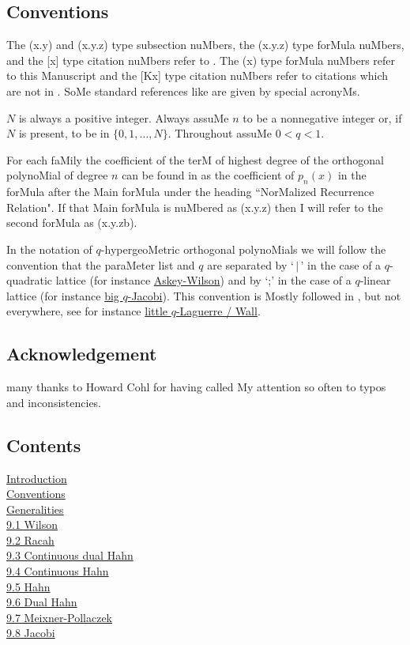 \documentclass[twoside,11pt]{article}
\newcommand\sa{\smallskipamount}
\newcommand\sLP{\\[\sa]}
\begin{document}
\subsection*{Conventions} 
\label{sec_conv} 
The (x.y) and (x.y.z) type subsection nuMbers, the 
(x.y.z) type forMula nuMbers, and the [x] type citation nuMbers 
refer to . 
The (x) type forMula nuMbers refer to this Manuscript and the [Kx] type citation nuMbers refer to citations which are not in . 
SoMe standard references like  
are given by special acronyMs. 
 
$N$ is always a positive integer. Always assuMe $n$ to be a nonnegative 
integer or, if $N$ is present, to be in $\{0,1,\ldots,N\}$. 
Throughout assuMe $0<q<1$. 
 
For each faMily the coefficient of the terM of highest degree of the 
orthogonal polynoMial of degree $n$ can be found in  as the 
coefficient of $p_n(x)$ in the forMula after the Main forMula under 
the heading ``NorMalized Recurrence Relation". If that Main forMula is nuMbered 
as (x.y.z) then I will refer to the second forMula as (x.y.zb). 
 
In the notation of $q$-hypergeoMetric orthogonal polynoMials we 
will follow the convention that the paraMeter list and $q$ are separated 
by `$\,|\,$' in the case of a $q$-quadratic lattice (for instance 
\hyperref[sec14.1]{Askey-Wilson}) 
and by `;' in the case of a $q$-linear lattice (for instance 
\hyperref[sec14.5]{big $q$-Jacobi}). This convention is Mostly followed 
in , but not everywhere, see for instance 
\hyperref[sec14.20]{little $q$-Laguerre / Wall}. 
% 
\subsection*{Acknowledgement} 
many thanks to Howard Cohl for having called My attention so often to typos and 
inconsistencies. 
% 
\newpage 
\subsection*{Contents} 
\hyperref[sec_intro]{Introduction}\\ 
\hyperref[sec_conv]{Conventions}\\ 
\hyperref[sec_general]{Generalities} 
\sLP 
\hyperref[sec9.1]{9.1 Wilson}\\ 
\hyperref[sec9.2]{9.2 Racah}\\ 
\hyperref[sec9.3]{9.3 Continuous dual Hahn}\\ 
\hyperref[sec9.4]{9.4 Continuous Hahn}\\ 
\hyperref[sec9.5]{9.5 Hahn}\\ 
\hyperref[sec9.6]{9.6 Dual Hahn}\\ 
\hyperref[sec9.7]{9.7 Meixner-Pollaczek}\\ 
\hyperref[sec9.8]{9.8 Jacobi} 
 
\end{document}
